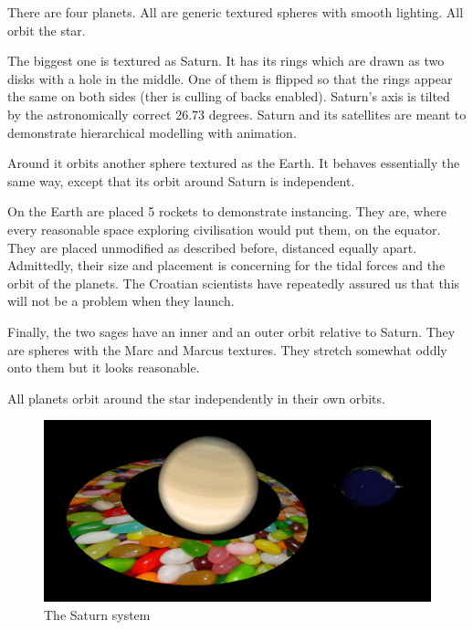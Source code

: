 \documentclass[10pt]{article}
\begin{document}
        There are four planets. All are generic textured spheres with smooth
        lighting. All orbit the star.

        The biggest one is textured as Saturn. It has its rings which are drawn
        as two disks with a hole in the middle. One of them is flipped so that
        the rings appear the same on both sides (ther is culling of backs enabled).
        Saturn's axis is tilted by the astronomically correct 26.73 degrees.
        Saturn and its satellites are meant to demonstrate hierarchical
        modelling with animation.

        Around it orbits another sphere textured as the Earth. It behaves
        essentially the same way, except that its orbit around Saturn is
        independent.

        On the Earth are placed 5 rockets to demonstrate instancing. They are,
        where every reasonable space exploring civilisation would put them,
        on the equator. They are placed unmodified as described before,
        distanced equally apart. Admittedly, their size and placement is
        concerning for the tidal forces and the orbit of the planets. The
        Croatian scientists have repeatedly assured us that this will not be a
        problem when they launch.

        Finally, the two sages have an inner and an outer orbit relative to
        Saturn. They are spheres with the Marc and Marcus textures. They
        stretch somewhat oddly onto them but it looks reasonable.

        All planets orbit around the star independently in their own orbits.


        \begin{figure}[h!]
            \caption{The Saturn system}
            \includegraphics[width=\textwidth]{saturn_system}
        \end{figure}
\end{document}
